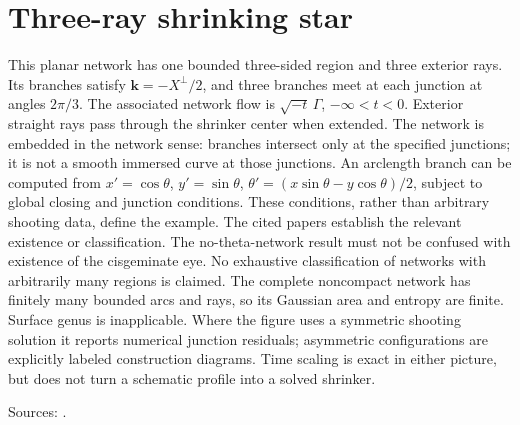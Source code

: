 \chapter{Three-ray shrinking star}\label{sec:catalogue-network-three-ray}
\begin{example}\label{ex:catalogue-network-three-ray}
This planar network has one bounded three-sided region and three exterior rays. Its branches satisfy $\mathbf k=-X^\perp/2$, and three branches meet at each junction at angles $2\pi/3$. The associated network flow is $\sqrt{-t}\,\Gamma$, $-\infty<t<0$. Exterior straight rays pass through the shrinker center when extended. The network is embedded in the network sense: branches intersect only at the specified junctions; it is not a smooth immersed curve at those junctions.
An arclength branch can be computed from $x'=\cos\theta$, $y'=\sin\theta$, $\theta'=(x\sin\theta-y\cos\theta)/2$, subject to global closing and junction conditions. These conditions, rather than arbitrary shooting data, define the example. The cited papers establish the relevant existence or classification. The no-theta-network result must not be confused with existence of the cisgeminate eye. No exhaustive classification of networks with arbitrarily many regions is claimed.
The complete noncompact network has finitely many bounded arcs and rays, so its Gaussian area and entropy are finite. Surface genus is inapplicable. Where the figure uses a symmetric shooting solution it reports numerical junction residuals; asymmetric configurations are explicitly labeled construction diagrams. Time scaling is exact in either picture, but does not turn a schematic profile into a solved shrinker.
\par Sources: \cite{CatChang2026,CatChenGuo2007}.
\end{example}

